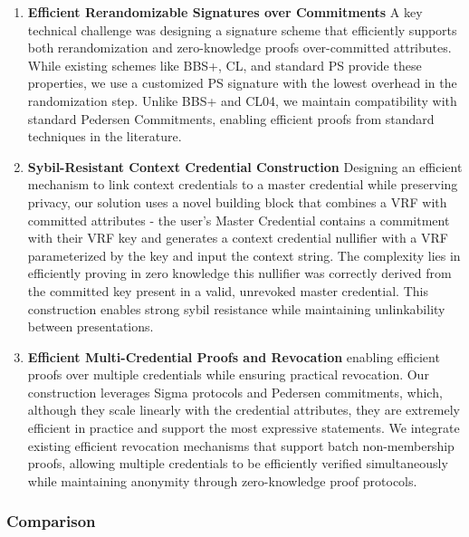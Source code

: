 \begin{enumerate}

    \item \textbf{Efficient Rerandomizable Signatures over Commitments} A key technical challenge was designing a signature scheme that efficiently supports both rerandomization and zero-knowledge proofs over-committed attributes. While existing schemes like BBS+, CL, and standard PS provide these properties, we use a customized PS signature with the lowest overhead in the randomization step. %
    Unlike BBS+ and CL04, we maintain compatibility with standard Pedersen Commitments, enabling efficient proofs from standard techniques in the literature.
    

    \item \textbf{Sybil-Resistant Context Credential Construction} Designing an efficient mechanism to link context credentials to a master credential while preserving privacy, our solution uses a novel building block that combines a VRF with committed attributes - the user's Master Credential contains a commitment with their VRF key and generates a context credential nullifier with a VRF parameterized by the key and input the context string. 
    The complexity lies in efficiently proving in zero knowledge this nullifier was correctly derived from the committed key present in a valid, unrevoked master credential. This construction enables strong sybil resistance while maintaining unlinkability between presentations.


    \item \textbf{Efficient Multi-Credential Proofs and Revocation} enabling efficient proofs over multiple credentials while ensuring practical revocation. Our construction leverages Sigma protocols and Pedersen commitments, which, although they scale linearly with the credential attributes, they are extremely efficient in practice and support the most expressive statements. We integrate existing efficient revocation mechanisms that support batch non-membership proofs, allowing multiple credentials to be efficiently verified simultaneously while maintaining anonymity through zero-knowledge proof protocols. 

\end{enumerate}


\subsubsection{Comparison}


